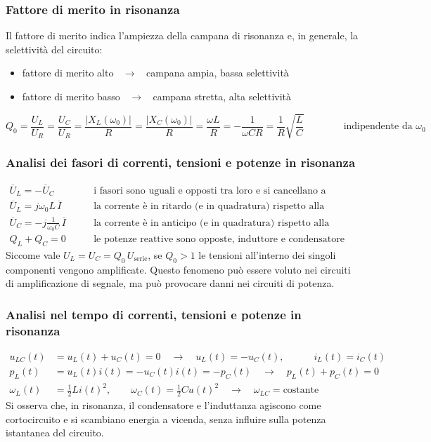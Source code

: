 \documentclass[a4paper]{article}
\begin{document}
\subsubsection*{Fattore di merito in risonanza}
Il fattore di merito indica l'ampiezza della campana di risonanza e, in generale, la selettività del circuito:
\begin{itemize}
	\item fattore di merito alto \(\;\; \rightarrow \;\;\) campana ampia, bassa selettività
	\item fattore di merito basso \(\;\; \rightarrow \;\;\) campana stretta, alta selettività
\end{itemize}

\[Q_0 = \frac{U_L}{U_R} = \frac{U_C}{U_R} = \frac{\left|X_L(\omega_0)\right|}{R} = \frac{\left|X_C(\omega_0)\right|}{R} = \frac{\omega L}{R} = -\frac{1}{\omega C R} = \frac{1}{R} \sqrt{\frac{L}{C}} \qquad\qquad \text{indipendente da } \omega_0\]

\newpage

\subsubsection*{Analisi dei fasori di correnti, tensioni e potenze in risonanza}
\begin{align*}
	\overline{U}_L = - \overline{U}_C \qquad &\text{i fasori sono uguali e opposti tra loro e si cancellano a vicenda} \\
	\overline{U}_L = j \omega_0 L \, \overline{I} \qquad &\text{la corrente è in ritardo (e in quadratura) rispetto alla tensione nell'induttanza} \\
	\overline{U}_C = - j \frac{1}{\omega_0 C} \, \overline{I} \qquad &\text{la corrente è in anticipo (e in quadratura) rispetto alla tensione nel condensatore} \\
	Q_L + Q_C = 0 \qquad &\text{le potenze reattive sono opposte, induttore e condensatore agiscono in cortocircuito}
\end{align*}
Siccome vale \(U_L = U_C = Q_0 \, U_\text{serie}\), se \(Q_0 > 1\) le tensioni all'interno dei singoli componenti vengono amplificate.
Questo fenomeno può essere voluto nei circuiti di amplificazione di segnale, ma può provocare danni nei circuiti di potenza.

\subsubsection*{Analisi nel tempo di correnti, tensioni e potenze in risonanza}
\begin{align*}
	u_{LC}(t) &= u_L(t) + u_C(t) = 0 \quad \rightarrow \quad u_L(t) = - u_C(t), \qquad\quad i_L(t) = i_C(t) \\
	p_L(t) &= u_L(t) i(t) = - u_C(t) i(t) = - p_C(t) \quad \rightarrow \quad p_L(t) + p_C(t) = 0 \\
	\omega_L(t) &= \frac{1}{2} Li(t)^2, \qquad \omega_C(t) = \frac{1}{2} Cu(t)^2 \quad \rightarrow \quad \omega_{LC} = \text{costante}
\end{align*}
Si osserva che, in risonanza, il condensatore e l'induttanza agiscono come cortocircuito e si scambiano energia a vicenda, senza
influire sulla potenza istantanea del circuito.
\end{document}
